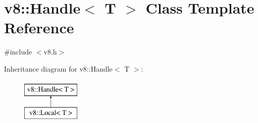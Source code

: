 \hypertarget{classv8_1_1Handle}{}\section{v8\+:\+:Handle$<$ T $>$ Class Template Reference}
\label{classv8_1_1Handle}


{\ttfamily \#include $<$v8.\+h$>$}

Inheritance diagram for v8\+:\+:Handle$<$ T $>$\+:\begin{figure}[H]
\begin{center}
\leavevmode
\includegraphics[height=2.000000cm]{classv8_1_1Handle}
\end{center}
\end{figure}
